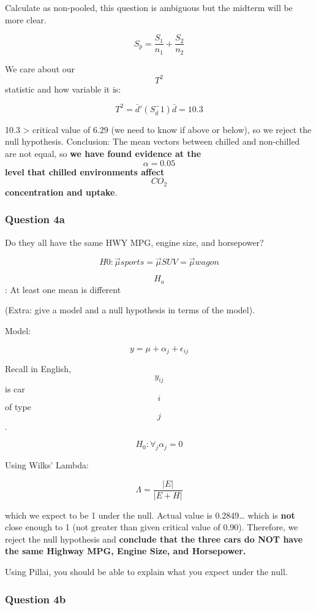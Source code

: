 Calculate as non-pooled, this question is ambiguous but the midterm will
be more clear.

\[S_{\bar{p}} = \frac{S_1}{n_1} + \frac{S_2}{n_2}\]

We care about our \[T^2\] statistic and how variable it is:

\[T^2 = \bar{d}'(S_{\bar{d}}^-1)\bar{d} = 10.3\]

10.3 \textgreater{} critical value of 6.29 (we need to know if above or
below), so we reject the null hypothesis. Conclusion: The mean vectors
between chilled and non-chilled are not equal, so \textbf{we have found
evidence at the} \[\alpha = 0.05\] \textbf{level that chilled
environments affect} \[CO_2\] \textbf{concentration and uptake}.

\hypertarget{question-4a}{%
\subsubsection{Question 4a}\label{question-4a}}

Do they all have the same HWY MPG, engine size, and horsepower?

\[H0: \vec{\mu}{sports} = \vec{\mu}{SUV} = \vec{\mu}{wagon}\]

\[H_a\]: At least one mean is different

(Extra: give a model and a null hypothesis in terms of the model).

Model:

\[y = \mu + \alpha_j + \epsilon_{ij}\]

Recall in English, \[y_{ij}\] is car \[i\] of type \[j\].

\[H_0: \forall_j \alpha_j = 0\]

Using Wilks' Lambda:

\[\Lambda = \frac{| E |}{| E + H|}\]

which we expect to be 1 under the null. Actual value is 0.2849\ldots{}
which is \textbf{not} close enough to 1 (not greater than given critical
value of 0.90). Therefore, we reject the null hypothesis and
\textbf{conclude that the three cars do NOT have the same Highway MPG,
Engine Size, and Horsepower.}

Using Pillai, you should be able to explain what you expect under the
null.

\hypertarget{question-4b}{%
\subsubsection{Question 4b}\label{question-4b}}

